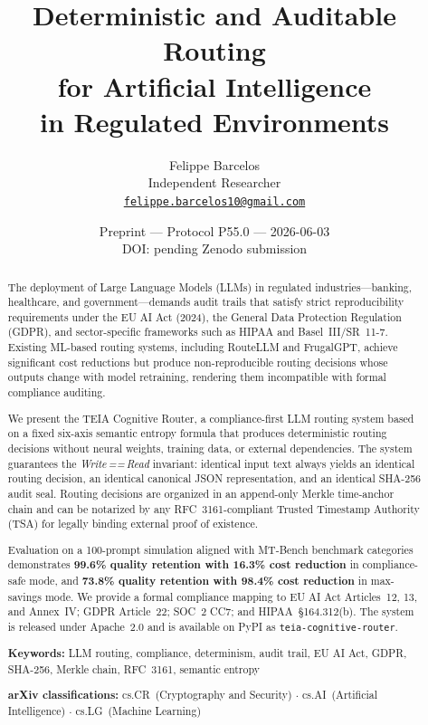 \documentclass[11pt,a4paper]{article}
\title{\textbf{Deterministic and Auditable Routing\\
       for Artificial Intelligence\\
       in Regulated Environments}}
\author{
  Felippe Barcelos\\
  Independent Researcher\\
  \href{mailto:felippe.barcelos10@gmail.com}{\texttt{felippe.barcelos10@gmail.com}}
}
\date{Preprint --- Protocol P55.0 --- 2026-06-03\\
      \small{DOI: pending Zenodo submission}}
\newcommand{\teia}{\textsc{TEIA}}
\newcommand{\wwr}{\emph{Write\,==\,Read}}
\begin{document}
\maketitle

\begin{abstract}
The deployment of Large Language Models (LLMs) in regulated industries---banking,
healthcare, and government---demands audit trails that satisfy strict reproducibility
requirements under the EU AI Act (2024), the General Data Protection Regulation
(GDPR), and sector-specific frameworks such as HIPAA and Basel~III/SR~11-7.
Existing ML-based routing systems, including RouteLLM and FrugalGPT, achieve
significant cost reductions but produce non-reproducible routing decisions whose
outputs change with model retraining, rendering them incompatible with formal
compliance auditing.

We present the \teia{} Cognitive Router, a compliance-first LLM routing system
based on a fixed six-axis semantic entropy formula that produces deterministic
routing decisions without neural weights, training data, or external dependencies.
The system guarantees the \wwr{} invariant: identical input text always yields an
identical routing decision, an identical canonical JSON representation, and an
identical SHA-256 audit seal. Routing decisions are organized in an append-only
Merkle time-anchor chain and can be notarized by any RFC~3161-compliant Trusted
Timestamp Authority (TSA) for legally binding external proof of existence.

Evaluation on a 100-prompt simulation aligned with MT-Bench benchmark categories
demonstrates \textbf{99.6\% quality retention with 16.3\% cost reduction} in
compliance-safe mode, and \textbf{73.8\% quality retention with 98.4\% cost
reduction} in max-savings mode. We provide a formal compliance mapping to EU AI
Act Articles~12, 13, and Annex~IV; GDPR Article~22; SOC~2 CC7; and
HIPAA~\S164.312(b). The system is released under Apache~2.0 and is available
on PyPI as \texttt{teia-cognitive-router}.

\medskip
\noindent\textbf{Keywords:} LLM routing, compliance, determinism, audit trail,
EU AI Act, GDPR, SHA-256, Merkle chain, RFC~3161, semantic entropy

\medskip
\noindent\textbf{arXiv classifications:} cs.CR~(Cryptography and Security)
$\cdot$ cs.AI~(Artificial Intelligence) $\cdot$ cs.LG~(Machine Learning)
\end{abstract}
\end{document}
